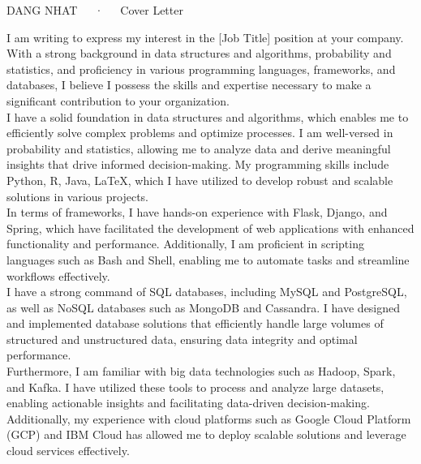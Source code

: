 \documentclass[11pt, a4paper]{awesome-cv}
\begin{document}
\makecvheader[R]

\makecvfooter
  {DANG NHAT~~~·~~~Cover Letter}
  {}

\makelettertitle

\begin{cvletter}
I am writing to express my interest in the [Job Title] position at your company. With a strong background in data structures and algorithms, probability and statistics, and proficiency in various programming languages, frameworks, and databases, I believe I possess the skills and expertise necessary to make a significant contribution to your organization.\\
I have a solid foundation in data structures and algorithms, which enables me to efficiently solve complex problems and optimize processes. I am well-versed in probability and statistics, allowing me to analyze data and derive meaningful insights that drive informed decision-making. My programming skills include Python, R, Java, LaTeX, which I have utilized to develop robust and scalable solutions in various projects.\\
In terms of frameworks, I have hands-on experience with Flask, Django, and Spring, which have facilitated the development of web applications with enhanced functionality and performance. Additionally, I am proficient in scripting languages such as Bash and Shell, enabling me to automate tasks and streamline workflows effectively.\\
I have a strong command of SQL databases, including MySQL and PostgreSQL, as well as NoSQL databases such as MongoDB and Cassandra. I have designed and implemented database solutions that efficiently handle large volumes of structured and unstructured data, ensuring data integrity and optimal performance.\\
Furthermore, I am familiar with big data technologies such as Hadoop, Spark, and Kafka. I have utilized these tools to process and analyze large datasets, enabling actionable insights and facilitating data-driven decision-making. Additionally, my experience with cloud platforms such as Google Cloud Platform (GCP) and IBM Cloud has allowed me to deploy scalable solutions and leverage cloud services effectively.\\

\end{cvletter}
\end{document}
